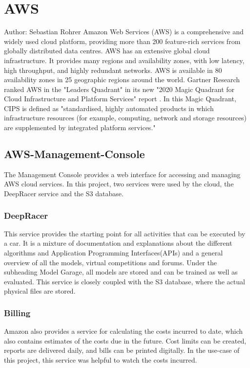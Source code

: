 \chapter{AWS}
Author: Sebastian Rohrer \newline
Amazon Web Services (AWS) is a comprehensive and widely used cloud platform, providing more than 200 feature-rich services from globally distributed data centres. 
AWS has an extensive global cloud infrastructure. It provides many regions and availability zones, with low latency, high throughput, and highly redundant networks. AWS is available in 80 availability zones in 25 geographic regions around the world.
Gartner Research ranked AWS in the "Leaders Quadrant" in its new "2020 Magic Quadrant for Cloud Infrastructure and Platform Services" report . In this Magic Quadrant, CIPS is defined as "standardised, highly automated products in which infrastructure resources (for example, computing, network and storage resources) are supplemented by integrated platform services."

\section{AWS-Management-Console} 
The Management Console provides a web interface for accessing and managing AWS cloud services. In this project, two services were used by the cloud, the DeepRacer service and the S3 database.

\subsection{DeepRacer}
This service provides the starting point for all activities that can be executed by a car. It is a mixture of documentation and explanations about the different algorithms and Application Programming Interfaces(APIs) and a general overview of all the models, virtual competitions and forums. Under the subheading Model Garage, all models are stored and can be trained as well as evaluated. This service is closely coupled with the S3 database, where the actual physical files are stored. 


\subsection{Billing}
Amazon also provides a service for calculating the costs incurred to date, which also contains estimates of the costs due in the future. Cost limits can be created, reports are delivered daily, and bills can be printed digitally. In the use-case of this project, this service was helpful to watch the costs incurred.

